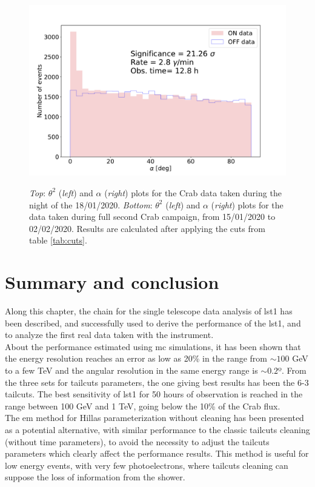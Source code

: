 \documentclass[main.tex]{subfiles}
\begin{document}
\begin{figure}
  \endminipage
  \includegraphics[width=1\textwidth]{Pictures/alphaplot_int500_gammaness0-6.pdf}
  \endminipage \\
  \caption{\textit{Top}: $\theta^2$ (\textit{left}) and $\alpha$ (\textit{right}) plots for the Crab data taken during the night of the 18/01/2020. \textit{Bottom}: $\theta^2$ (\textit{left}) and $\alpha$ (\textit{right}) plots for the data taken during full second Crab campaign, from 15/01/2020 to 02/02/2020. Results are calculated after applying the cuts from table \ref{tab:cuts}.} \label{fig:crabana}
\end{figure}

\section{Summary and conclusion}

Along this chapter, the chain for the single telescope data analysis of \gls{lst}1 has been described, and successfully used to derive the performance of the \gls{lst}1, and to analyze the first real data taken with the instrument.\\
About the performance estimated using \gls{mc} simulations, it has been shown that the energy resolution reaches an error as low as 20\% in the range from $\sim 100$ GeV to a few TeV and the angular resolution in the same energy range is $\sim 0.2$º. From the three sets for tailcuts parameters, the one giving best results has been the 6-3 tailcuts. The best sensitivity of \gls{lst}1 for 50 hours of observation is reached in the range between 100 GeV and 1 TeV, going below the 10\% of the Crab flux.\\
The \gls{em} method for Hillas parameterization without cleaning has been presented as a potential alternative, with similar performance to the classic tailcuts cleaning (without time parameters), to avoid the necessity to adjust the tailcuts parameters which clearly affect the performance results. This method is useful for low energy events, with very few photoelectrons, where tailcuts cleaning can suppose the loss of information from the shower.  
\end{document}
